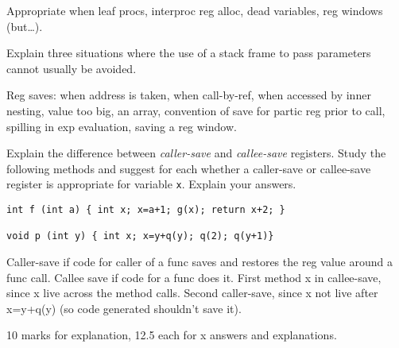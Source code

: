 \documentclass[11pt]{bareexam}
\begin{document}
\begin{questions}
\begin{subquestions}
\begin{subsubquestions}
\begin{modelanswer}
Appropriate when leaf procs, interproc
reg alloc, dead variables, reg windows (but\ldots).
\end{modelanswer}

\subsubquestion
Explain three situations where the use of a 
stack frame to pass parameters cannot usually be avoided.
\end{subsubquestions}
\begin{modelanswer}
Reg saves: when address is taken,
when call-by-ref,
when accessed by inner nesting,
value too big,
an array,
convention of save for partic reg prior to call,
spilling in exp evaluation,
saving a reg window.
\end{modelanswer}

\subquestion
\begin{subsubquestions}
\subsubquestion
Explain the difference between \emph{caller-save\/} and \emph{callee-save\/}
registers. 
\subsubquestion
Study the following methods and suggest for each whether a caller-save 
or callee-save register is appropriate for variable \verb+x+. 
Explain your answers.
\begin{verbatim}
int f (int a) { int x; x=a+1; g(x); return x+2; }

void p (int y) { int x; x=y+q(y); q(2); q(y+1)}
\end{verbatim}
\end{subsubquestions}

\begin{modelanswer}
Caller-save if code for caller of a func saves and restores the reg value
around a func call. Callee save if code for a func does it. First method x in
callee-save, since x live across the method calls. Second caller-save, since
x not live after x=y+q(y) (so code generated shouldn't save it).

10 marks for explanation,  12.5 each for x answers and explanations.
\end{modelanswer}

\end{subquestions}

\end{questions}
\end{document}
